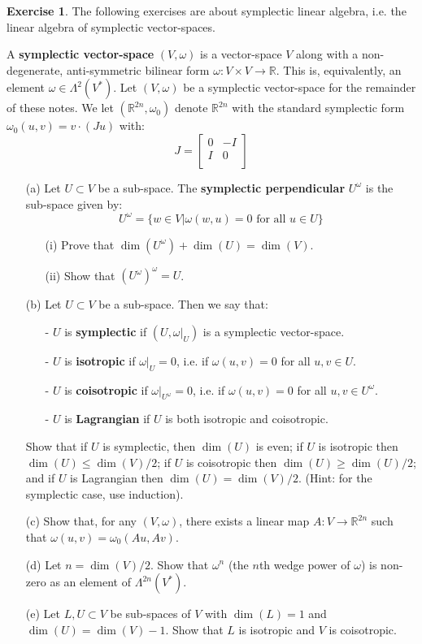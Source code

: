 \documentclass[12pt]{article}
\theoremstyle{definition}
\newtheorem{exercise}[theorem]{Exercise}
\numberwithin{equation}{section}
\newcommand{\R}{{\mathbb R}}
\newcommand{\op}{\operatorname}
\begin{document}
\begin{exercise} \label{ex:symplectic_linear_algebra} The following exercises are about symplectic linear algebra, i.e. the linear algebra of symplectic vector-spaces. 

A {\bf symplectic vector-space} $(V,\omega)$ is a vector-space $V$ along with a non-degenerate, anti-symmetric bilinear form $\omega:V \times V \to \R$. This is, equivalently, an element $\omega \in \Lambda^2(V^*)$. Let $(V,\omega)$ be a symplectic vector-space for the remainder of these notes. We let $(\R^{2n},\omega_0)$ denote $\R^{2n}$ with the standard symplectic form $\omega_0(u,v) = v \cdot (Ju)$ with:
\[
J = \left[\begin{array}{cc}
0 & -I\\
I & 0\\
\end{array}\right] 
\]

\begin{itemize}
	\item[(a)] Let $U \subset V$ be a sub-space. The {\bf symplectic perpendicular} $U^\omega$ is the sub-space given by:
	\[U^\omega = \{w \in V| \omega(w,u) = 0 \text{ for all }u \in U\}\]
	\begin{itemize}
		\item[(i)] Prove that $\op{dim}(U^\omega) + \op{dim}(U) = \op{dim}(V)$.
		\item[(ii)] Show that $(U^\omega)^\omega = U$.
	\end{itemize}
	\item[(b)] Let $U \subset V$ be a sub-space. Then we say that: 
	\begin{itemize}
		\item[-] $U$ is {\bf symplectic} if $(U,\omega|_U)$ is a symplectic vector-space.
		\item[-] $U$ is {\bf isotropic} if $\omega|_U = 0$, i.e. if $\omega(u,v) = 0$ for all $u,v \in U$.
		\item[-] $U$ is {\bf coisotropic} if $\omega|_{U^\omega} = 0$, i.e. if $\omega(u,v) = 0$ for all $u,v \in U^\omega$.
		\item[-] $U$ is {\bf Lagrangian} if $U$ is both isotropic and coisotropic.
	\end{itemize}
	Show that if $U$ is symplectic, then $\op{dim}(U)$ is even; if $U$ is isotropic then $\op{dim}(U) \le \op{dim}(V)/2$; if $U$ is coisotropic then $\op{dim}(U) \ge \op{dim}(U)/2$; and if $U$ is Lagrangian then $\op{dim}(U) = \op{dim}(V)/2$. (Hint: for the symplectic case, use induction).
	\item[(c)] Show that, for any $(V,\omega)$, there exists a linear map $A:V \to \R^{2n}$ such that $\omega(u,v) = \omega_0(Au,Av)$.
	\item[(d)] Let $n = \op{dim}(V)/2$. Show that $\omega^n$ (the $n$th wedge power of $\omega$) is non-zero as an element of $\Lambda^{2n}(V^*)$.
	\item[(e)] Let $L,U \subset V$ be sub-spaces of $V$ with $\op{dim}(L) = 1$ and $\op{dim}(U) = \op{dim}(V) - 1$. Show that $L$ is isotropic and $V$ is coisotropic.
\end{itemize}
\end{exercise}
\end{document}
